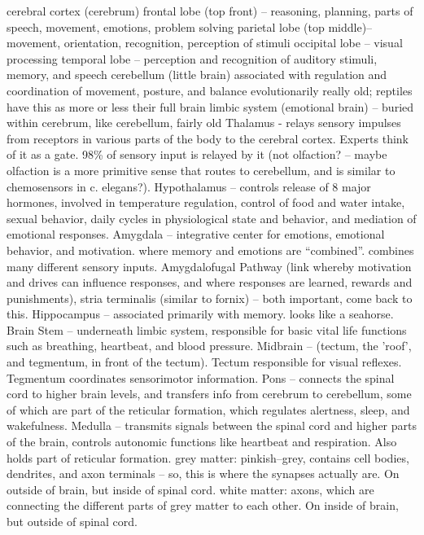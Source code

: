 \documentclass[11pt, a4paper, oneside]{article}   	%
\begin{document}
\begin{outline}
    \point cerebral cortex (cerebrum)
        \subpoint frontal lobe (top front) -- reasoning, planning, parts of speech, movement, emotions, problem solving
        \subpoint parietal lobe (top middle)-- movement,  orientation, recognition, perception of stimuli
        \subpoint occipital lobe -- visual processing
        \subpoint temporal lobe -- perception and recognition of auditory stimuli, memory, and speech
    \point cerebellum (little brain)
        \subpoint associated with regulation and coordination of movement, posture, and balance
        \subpoint evolutionarily really old; reptiles have this as more or less their full brain
    \point limbic system (emotional brain) -- buried within cerebrum, like cerebellum, fairly old
      \subpoint Thalamus - relays sensory impulses from receptors in various parts of the body to the cerebral cortex. Experts think of it as a gate. 98\% of sensory input is relayed by it (not olfaction? -- maybe olfaction is a more primitive sense that routes to cerebellum, and is similar to chemosensors in c. elegans?).
      \subpoint Hypothalamus  -- controls release of 8 major hormones, involved in temperature regulation, control of food and water intake,  sexual behavior,  daily cycles in physiological state and behavior, and mediation of emotional responses. 
      \subpoint Amygdala -- integrative center for emotions, emotional behavior, and motivation.  where memory and emotions are ``combined''. combines many different sensory inputs.
        \subsubpoint Amygdalofugal Pathway (link whereby motivation and drives can influence responses, and where responses are learned, rewards and punishments), stria terminalis (similar to fornix) -- both important, come back to this.
      \subpoint Hippocampus -- associated primarily with memory. looks like a seahorse. 
    \point Brain Stem -- underneath limbic system, responsible for basic vital life functions such as breathing, heartbeat, and blood pressure.
        \subpoint Midbrain -- (tectum, the 'roof', and tegmentum, in front of the tectum). Tectum responsible for visual reflexes. Tegmentum coordinates sensorimotor  information. 
        \subpoint Pons -- connects the spinal cord to higher brain levels, and transfers info from cerebrum to cerebellum, some of which are part of the reticular formation, which  regulates alertness, sleep, and wakefulness.
        \subpoint Medulla -- transmits signals between the spinal cord and higher parts of the brain, controls autonomic functions like heartbeat and respiration. Also holds part of reticular formation.
    \point grey matter: pinkish--grey, contains cell bodies, dendrites, and axon terminals -- so, this is where the synapses actually are. On outside of brain, but inside of spinal cord.
    \point white matter: axons, which are connecting the different parts of grey matter to each other. On inside of brain, but outside of spinal cord.
\end{outline}
\end{document}
